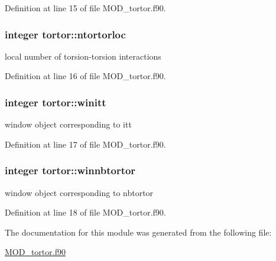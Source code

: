 Definition at line 15 of file M\-O\-D\-\_\-tortor.\-f90.

\hypertarget{classtortor_a38e4da5e763b212eb88e9152f1cab574}{
\subsubsection[{ntortorloc}]{\setlength{\rightskip}{0pt plus 5cm}integer tortor\-::ntortorloc}}\label{classtortor_a38e4da5e763b212eb88e9152f1cab574}


local number of torsion-\/torsion interactions 



Definition at line 16 of file M\-O\-D\-\_\-tortor.\-f90.

\hypertarget{classtortor_a9ca291a60c5f84b699cdd664e5371e84}{
\subsubsection[{winitt}]{\setlength{\rightskip}{0pt plus 5cm}integer tortor\-::winitt}}\label{classtortor_a9ca291a60c5f84b699cdd664e5371e84}


window object corresponding to itt 



Definition at line 17 of file M\-O\-D\-\_\-tortor.\-f90.

\hypertarget{classtortor_a60ae762814244a4d4e9fcf2938394c07}{
\subsubsection[{winnbtortor}]{\setlength{\rightskip}{0pt plus 5cm}integer tortor\-::winnbtortor}}\label{classtortor_a60ae762814244a4d4e9fcf2938394c07}


window object corresponding to nbtortor 



Definition at line 18 of file M\-O\-D\-\_\-tortor.\-f90.



The documentation for this module was generated from the following file\-:\begin{DoxyCompactItemize}
\item 
\hyperlink{MOD__tortor_8f90}{M\-O\-D\-\_\-tortor.\-f90}\end{DoxyCompactItemize}
